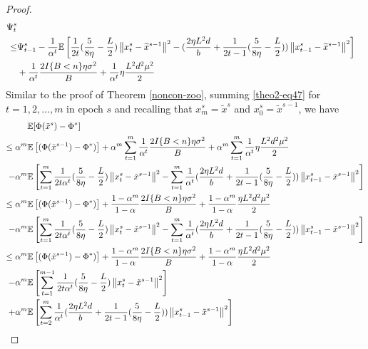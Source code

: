\documentclass{article}
\newcommand*{\E}{\mathbb{E}}
\newcommand{\norm}[1]{\left\lVert#1\right\rVert}
\theoremstyle{definition}
\theoremstyle{remark}
\begin{document}
\begin{proof}
{\color{Brown}
\begin{align} 
\Psi_t^s \notag
\\ \leq& \Psi_{t-1}^s - \frac{1}{\alpha^t}\E\left[ \frac{1}{2t}(\frac{5}{8\eta} - \frac{L}{2})\norm{{x}_t^s-\widetilde{x}^{s-1}}^2-(\frac{2\eta L^2 d}{b}+\frac{1}{2t-1}(\frac{5}{8\eta} - \frac{L}{2}))\norm{x_{t-1}^s-\widetilde{x}^{s-1}}^2\right]\notag\\
&+ \frac{1}{\alpha^t}\frac{2I\{B < n\}\eta \sigma ^2}{B}+\frac{1}{\alpha^t}\eta \frac{L^2 d^2 \mu^2}{2}\label{theo2-eq47}
 \end{align}
 }
Similar to the proof of Theorem \ref{noncon-zoo}, summing \eqref{theo2-eq47} for $t=1, 2, \ldots, m$ in epoch $s$ and recalling that $x_m^s = \tilde{x}^s$ and $x_0^s = \tilde{x}^{s-1}$, we have 
{\color{Brown}
\begin{align}
\E&[\Phi(\tilde{x}^s)-\Phi^*]\notag\\
\leq\alpha^m\E&\left[(\Phi(\tilde{x}^{s-1}) - \Phi^*)\right] +\alpha^m\sum_{t=1}^m \frac{1}{\alpha^t}\frac{2I\{B < n\}\eta \sigma ^2}{B}+\alpha^m\sum_{t=1}^m \frac{1}{\alpha^t}\eta \frac{L^2 d^2 \mu^2}{2}\notag
\\-\alpha^m\E&\left[\sum_{t=1}^m\frac{1}{2t\alpha^t}(\frac{5}{8\eta} - \frac{L}{2})\norm{{x}_t^s-\tilde{x}^{s-1}}^2-\sum_{t=1}^m\frac{1}{\alpha^t}(\frac{2\eta L^2 d}{b}+\frac{1}{2t-1}(\frac{5}{8\eta} - \frac{L}{2})) \norm{x_{t-1}^s-\tilde{x}^{s-1}}^2 \right]\notag\\
\leq\alpha^m\E&\left[(\Phi(\tilde{x}^{s-1}) - \Phi^*)\right] + \frac{1-\alpha^m}{1-\alpha}\frac{2I\{B < n\}\eta \sigma ^2}{B}+\frac{1-\alpha^m}{1-\alpha} \frac{\eta L^2 d^2 \mu^2}{2}\notag
\\-\alpha^m\E&\left[\sum_{t=1}^m\frac{1}{2t\alpha^t}(\frac{5}{8\eta} - \frac{L}{2})\norm{{x}_t^s-\tilde{x}^{s-1}}^2-\sum_{t=1}^m\frac{1}{\alpha^t}(\frac{2\eta L^2 d}{b}+\frac{1}{2t-1}(\frac{5}{8\eta} - \frac{L}{2})) \norm{x_{t-1}^s-\tilde{x}^{s-1}}^2 \right]\notag\\
\leq\alpha^m\E&\left[(\Phi(\tilde{x}^{s-1}) - \Phi^*)\right] + \frac{1-\alpha^m}{1-\alpha}\frac{2I\{B < n\}\eta \sigma ^2}{B}+\frac{1-\alpha^m}{1-\alpha}\frac{\eta L^2 d^2 \mu^2}{2}\notag
\\-\alpha^m\E&\left[\sum_{t=1}^{m-1}\frac{1}{2t\alpha^t}(\frac{5}{8\eta} - \frac{L}{2})\norm{{x}_t^s-\tilde{x}^{s-1}}^2\right]\notag\\
+\alpha^m\E&\left[\sum_{t=2}^m\frac{1}{\alpha^t}(\frac{2\eta L^2 d}{b}+\frac{1}{2t-1}(\frac{5}{8\eta} - \frac{L}{2})) \norm{x_{t-1}^s-\tilde{x}^{s-1}}^2 \right]\label{eq48}\\

\end{align}}
\end{proof}
\end{document}
